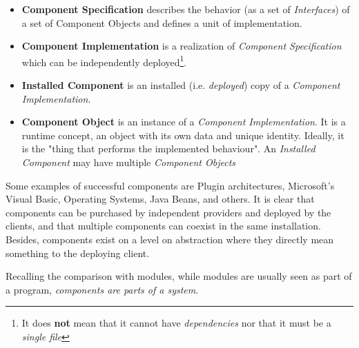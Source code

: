 \begin{itemize}
    \item \textbf{Component Specification} describes the behavior (as a set of \textit{Interfaces}) of a set of Component Objects and defines a unit of implementation.
    \item \textbf{Component Implementation} is a realization of \textit{Component Specification} which can be independently deployed\footnote{It does \textbf{not} mean that it cannot have \textit{dependencies} nor that it must be a \textit{single file}}.
    \item \textbf{Installed Component} is an installed (i.e. \textit{deployed}) copy of a \textit{Component Implementation}.
    \item \textbf{Component Object} is an instance of a \textit{Component Implementation}.
    It is a runtime concept, an object with its own data and unique identity.
    Ideally, it is the "thing that performs the implemented behaviour".
    An \textit{Installed Component} may have multiple \textit{Component Objects}
\end{itemize}

Some examples of successful components are Plugin architectures, Microsoft's Visual Basic, Operating Systems, Java Beans, and others.
It is clear that components can be purchased by independent providers and deployed by the clients, and that multiple components can coexist in the same installation.
Besides, components exist on a level on abstraction where they directly mean something to the deploying client.
\nl

Recalling the comparison with modules,
while modules are usually seen as part of a program, \textit{components are parts of a system}.

